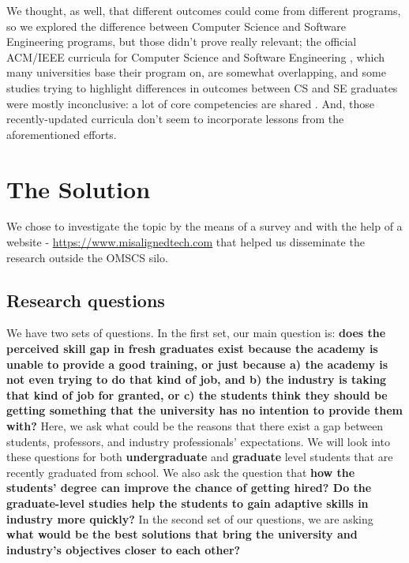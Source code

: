 \documentclass{sigchi}
\begin{document}
We thought, as well, that different outcomes could come from different programs, so we explored the difference between Computer Science and Software Engineering programs, but those didn't prove really relevant; the official ACM/IEEE curricula for Computer Science \cite{Force2013} and Software Engineering \cite{Ardis2015}, which many universities base their program on, are somewhat overlapping, and some studies trying to highlight differences in outcomes between CS and SE graduates were mostly inconclusive: a lot of core competencies are shared \cite{Meziane2004} \cite{Rasool2014}. And, those recently-updated curricula don't seem to incorporate lessons from the aforementioned efforts.

\section{The Solution}

We chose to investigate the topic by the means of a survey and with the help of a website - \url{https://www.misalignedtech.com} that helped us disseminate the research outside the OMSCS silo.

\subsection{Research questions}
We have two sets of questions. In the first set, our main question is: \textbf{does the perceived skill gap in fresh graduates exist because the academy is unable to provide a good training, or just because a) the academy is not even trying to do that kind of job, and b) the industry is taking that kind of job for granted, or c) the students think they should be getting something that the university has no intention to provide them with?} Here, we ask what could be the reasons that there exist a gap between students, professors, and industry professionals' expectations. We will look into these questions for both \textbf{undergraduate} and \textbf{graduate} level students that are recently graduated from school. We also ask the question that \textbf{how the students' degree can improve the chance of getting hired? Do the graduate-level studies help the students to gain adaptive skills in industry more quickly?}\newline
In the second set of our questions, we are asking \textbf{what would be the best solutions that bring the university and industry's objectives closer to each other?} 
\end{document}

